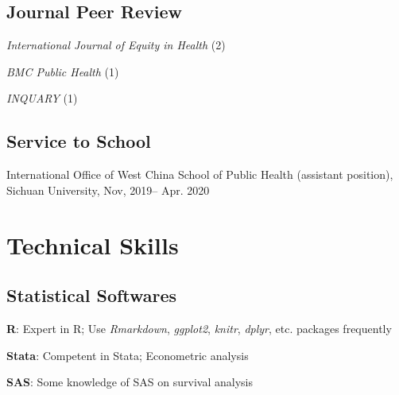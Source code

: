 \documentclass[12pt,letterpaper]{report}
\newcommand{\listitemspace}{0.35em}
\renewenvironment{itemize}
{\begin{list}{}{\setlength{\leftmargin}{0em}
            \setlength{\parskip}{0em}
            \setlength{\itemsep}{\listitemspace}
            \setlength{\parsep}{\listitemspace}}}
    {\end{list}}
\begin{document}
    \subsection*{Journal Peer Review}

    \begin{itemize}
        
        \item \textit{International Journal of Equity in Health} (2)
        \item \textit{BMC Public Health} (1)
        \item  \textit{INQUARY} (1)
       
    \end{itemize}

	
    \subsection*{Service to School}

    \begin{itemize}
    	
    	\item International Office of West China School of Public Health (assistant position), Sichuan University, Nov, 2019-- Apr. 2020
       
    \end{itemize}
	


    \section*{Technical Skills}

    \subsection*{Statistical Softwares}

    \begin{itemize}

        \item \textbf{R}: Expert in R; Use \textit{Rmarkdown}, \textit{ggplot2}, \textit{knitr}, \textit{dplyr}, etc. packages frequently
        \item \textbf{Stata}: Competent in Stata; Econometric analysis
        \item \textbf{SAS}: Some knowledge of SAS on survival analysis

    \end{itemize}
   
\end{document}
